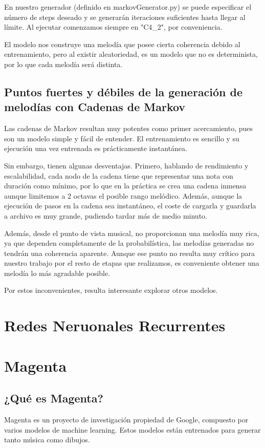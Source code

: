     En nuestro generador (definido en markovGenerator.py) se puede especificar el número de steps deseado y se generarán iteraciones suficientes hasta llegar al límite. Al ejecutar comenzamos siempre en "C4\_2", por conveniencia.

    El modelo nos construye una melodía que posee cierta coherencia debido al entrenamiento, pero al existir aleatoriedad, es un modelo que no es determinista, por lo que cada melodía será distinta.

    \subsection{Puntos fuertes y débiles de la generación de melodías con Cadenas de Markov}
    \label{subsec:ventajasYDesventajasMarkov}
    Las cadenas de Markov resultan muy potentes como primer acercamiento, pues son un modelo simple y fácil de entender. El entrenamiento es sencillo y su ejecución una vez entrenada es prácticamente instantánea.

    Sin embargo, tienen algunas desventajas. Primero, hablando de rendimiento y escalabilidad, cada nodo de la cadena tiene que representar una nota con duración como mínimo, por lo que en la práctica se crea una cadena inmensa aunque limitemos a 2 octavas el posible rango melódico. Además, aunque la ejecución de pasos en la cadena sea instantáneo, el coste de cargarla y guardarla a archivo es muy grande, pudiendo tardar más de medio minuto.

    Además, desde el punto de vista musical, no proporcionan una melodía muy rica, ya que dependen completamente de la probabilística, las melodías generadas no tendrán una coherencia aparente. Aunque ese punto no resulta muy crítico para nuestro trabajo por el resto de etapas que realizamos, es conveniente obtener una melodía lo más agradable posible.

    Por estos inconvenientes, resulta interesante explorar otros modelos.

\section{Redes Neruonales Recurrentes}
\label{sec:RNR}

\section{Magenta}
\label{sec:magenta}
    \subsection{¿Qué es Magenta?}
    \label{subsec:definicionMagenta}
    Magenta es un proyecto de investigación propiedad de Google, compuesto por varios modelos de machine learning. Estos modelos están entrenados para generar tanto música como dibujos.

